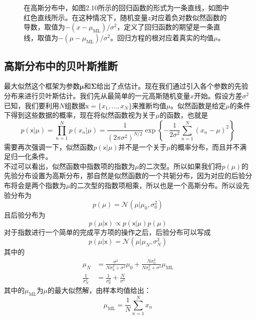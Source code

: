 \documentclass[b5paper]{book}
\numberwithin{equation}{chapter}
\newcommand {\bx} {\boldsymbol{\mathrm{x}}}
\newcommand {\sfx} {\boldsymbol{\mathsf{x}}}
\newcommand {\bfMu} {\boldsymbol{\mu}}
\newcommand {\bfSigma} {\boldsymbol{\Sigma}}
\begin{document}
{\begin{figure}[ht]
		\caption{在高斯分布中，如图2.10所示的回归函数的形式为一条直线，如图中红色直线所示。在这种情况下，随机变量$z$对应着负对数似然函数的导数，取值为$-(x-\mu_{\mathrm{ML}})/\sigma^2$，定义了回归函数的期望是一条直线，取值为$-(\mu-\mu_{\mathrm{ML}})/\sigma^2$。回归方程的根对应着真实的均值$\mu$。}
		\label{fig:2-11}
	\end{figure}
	}
	\subsection{高斯分布中的贝叶斯推断}
	\textnormal{
	最大似然这个框架为参数$\bfMu$和$\bfSigma$给出了点估计。现在我们通过引入各个参数的先验分布来进行贝叶斯估计。我们先从最简单的一元高斯随机变量$x$开始。假设方差$\sigma^2$已知，我们要利用$N$组数据$\bx=\{x_1,...,x_N\}$来推断均值$\mu$。似然函数是给定$\mu$的条件下得到这些数据的概率，现在将似然函数视为关于$\mu$的函数，也就是
	\begin{equation}
		p(\sfx|\mu)=\prod_{n=1}^Np(x_n|\mu)=\frac{1}{(2\pi\sigma^2)^{N/2}}\exp\left\{-\frac{1}{2\sigma^2}\sum_{n=1}^N(x_n-\mu)^2\right\}
	\end{equation}
	需要再次强调一下，似然函数$p(\sfx|\mu)$并不是一个关于$\mu$的概率分布，而且并不满足归一化条件。\\
	\indent 不过可以看出，似然函数中指数项的指数为$\mu$的二次型。所以如果我们将$p(\mu)$的先验分布设置为高斯分布，那自然是似然函数的一个共轭分布，因为对应的后验分布将会是两个指数为$\mu$的二次型的指数项相乘，所以也是一个高斯分布。所以设先验分布为
	\begin{equation}
		p(\mu)=\mathcal{N}(\mu|\mu_0,\sigma_0^2)
	\end{equation}
	且后验分布为
	\begin{equation}
		p(\mu|\sfx) \propto p(\sfx|\mu)p(\mu)
	\end{equation}
	对于指数进行一个简单的完成平方项的操作之后，后验分布可以写成
	\begin{equation}
		p(\mu|\sfx)=\mathcal{N}(\mu|\mu_N,\sigma_N^2)
	\end{equation}
	其中的
	\begin{align}
		\mu_N &=\frac{\sigma^2}{N\sigma_0^2+\sigma^2}\mu_0+\frac{N\sigma_0^2}{N\sigma_0^2+\sigma^2}\mu_{\mathrm{ML}}\\
		\frac{1}{\sigma_N^2}&=\frac{1}{\sigma_0^2}+\frac{N}{\sigma^2}
	\end{align}
	其中的$\mu_{\mathrm{ML}}$为$\mu$的最大似然解，由样本均值给出：
	\begin{equation}
		\mu_{\mathrm{ML}}=\frac{1}{N}\sum_{n=1}^Nx_n

\end{equation}}
\end{document}

